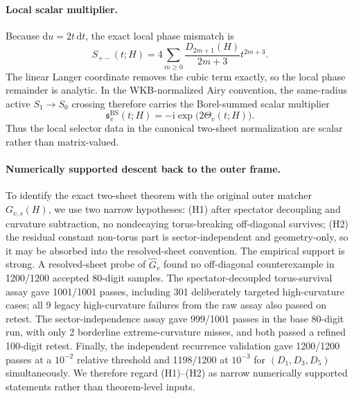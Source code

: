 \documentclass[aps,prl,reprint,superscriptaddress,nofootinbib]{revtex4-2}
\newcommand{\ii}{\mathrm{i}}
\newcommand{\dd}{\mathrm{d}}
\newcommand{\hatG}{\widehat G}
\begin{document}
\paragraph*{Local scalar multiplier.}
Because $\dd u=2t\,\dd t$, the exact local phase mismatch is
\begin{equation}
 S_{+-}(t;H)=4\sum_{m\ge0}\frac{D_{2m+1}(H)}{2m+3}t^{2m+3}.
\end{equation}
The linear Langer coordinate removes the cubic term exactly, so the local phase remainder is analytic. In the WKB-normalized Airy convention, the same-radius active $S_1\to S_0$ crossing therefore carries the Borel-summed scalar multiplier
\begin{equation}
 \mathfrak s_v^{\mathrm{BS}}(t;H)=-\ii\exp\!\bigl(2\Theta_v(t;H)\bigr).
 \label{eq:scalar}
\end{equation}
Thus the local selector data in the canonical two-sheet normalization are scalar rather than matrix-valued.

\paragraph*{Numerically supported descent back to the outer frame.}
To identify the exact two-sheet theorem with the original outer matcher $G_{v,s}(H)$, we use two narrow hypotheses: (H1) after spectator decoupling and curvature subtraction, no nondecaying torus-breaking off-diagonal survives; (H2) the residual constant non-torus part is sector-independent and geometry-only, so it may be absorbed into the resolved-sheet convention. The empirical support is strong. A resolved-sheet probe of $\hatG_v$ found no off-diagonal counterexample in 1200/1200 accepted 80-digit samples. The spectator-decoupled torus-survival assay gave 1001/1001 passes, including 301 deliberately targeted high-curvature cases; all 9 legacy high-curvature failures from the raw assay also passed on retest. The sector-independence assay gave 999/1001 passes in the base 80-digit run, with only 2 borderline extreme-curvature misses, and both passed a refined 100-digit retest. Finally, the independent recurrence validation gave 1200/1200 passes at a $10^{-2}$ relative threshold and 1198/1200 at $10^{-3}$ for $(D_1,D_3,D_5)$ simultaneously. We therefore regard (H1)--(H2) as narrow numerically supported statements rather than theorem-level inputs.
\end{document}
